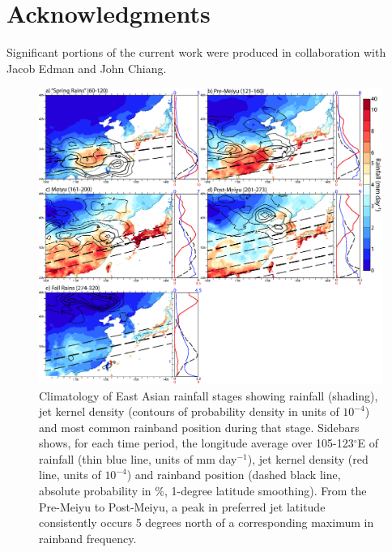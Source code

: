	
\section{Acknowledgments}

	Significant portions of the current work were produced in collaboration with Jacob Edman and John Chiang.


\begin{figure}
\centering
\noindent\includegraphics[width=36pc]{Figures/ch4/climo}
\caption{Climatology of East Asian rainfall stages showing rainfall (shading), jet kernel density (contours of probability density in units of $10^{-4}$) and most common rainband position during that stage. Sidebars shows, for each time period, the longitude average over 105-123$^{\circ}$E of rainfall (thin blue line, units of mm day$^{-1}$), jet kernel density (red line, units of $10^{-4}$) and rainband position (dashed black line, absolute probability in \%, 1-degree latitude smoothing). From the Pre-Meiyu to Post-Meiyu, a peak in preferred jet latitude consistently occurs 5 degrees north of a corresponding maximum in rainband frequency.}
\label{fig:climo}
\end{figure}


